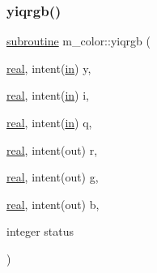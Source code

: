 \subsubsection{\texorpdfstring{yiqrgb()}{yiqrgb()}}
{\footnotesize\ttfamily \hyperlink{M__stopwatch_83_8txt_acfbcff50169d691ff02d4a123ed70482}{subroutine} m\+\_\+color\+::yiqrgb (\begin{DoxyParamCaption}\item[{\hyperlink{read__watch_83_8txt_abdb62bde002f38ef75f810d3a905a823}{real}, intent(\hyperlink{M__journal_83_8txt_afce72651d1eed785a2132bee863b2f38}{in})}]{y,  }\item[{\hyperlink{read__watch_83_8txt_abdb62bde002f38ef75f810d3a905a823}{real}, intent(\hyperlink{M__journal_83_8txt_afce72651d1eed785a2132bee863b2f38}{in})}]{i,  }\item[{\hyperlink{read__watch_83_8txt_abdb62bde002f38ef75f810d3a905a823}{real}, intent(\hyperlink{M__journal_83_8txt_afce72651d1eed785a2132bee863b2f38}{in})}]{q,  }\item[{\hyperlink{read__watch_83_8txt_abdb62bde002f38ef75f810d3a905a823}{real}, intent(out)}]{r,  }\item[{\hyperlink{read__watch_83_8txt_abdb62bde002f38ef75f810d3a905a823}{real}, intent(out)}]{g,  }\item[{\hyperlink{read__watch_83_8txt_abdb62bde002f38ef75f810d3a905a823}{real}, intent(out)}]{b,  }\item[{integer}]{status }\end{DoxyParamCaption})\hspace{0.3cm}{\ttfamily [private]}}


